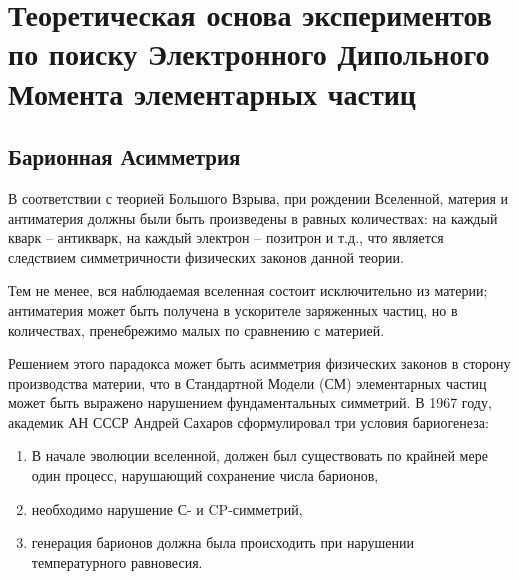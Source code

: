 \documentclass{report}
\begin{document}
\singlespacing


\tableofcontents 
\pagebreak

\onehalfspacing

\chapter{Теоретическая основа экспериментов по поиску Электронного Дипольного Момента элементарных частиц}
\newcommand{\dotprod}[2]{\; {#1} \cdot {#2}\;}
\newcommand{\xprod}[2]{{#1} \times {#2}}
\newcommand{\tensprod}[2]{#1 \otimes #2}
\newcommand{\SMatrix}{\mathcal{S}}
\newcommand{\TMatrix}{\mathcal{T}}
\newcommand{\IMatrix}{\mathcal{I}}

\newcommand{\ampl}[2]{\langle #1 \vert #2 \rangle}
\newcommand{\ket}[1]{\vert{#1}\rangle}
\newcommand{\bra}[1]{\langle{#1}\vert}

\section{Барионная Асимметрия} 

В соответствии с теорией Большого Взрыва, при рождении Вселенной, материя и антиматерия должны были быть произведены в равных количествах: на каждый кварк -- антикварк, на каждый электрон -- позитрон и т.д., что является следствием симметричности физических законов данной теории.

Тем не менее, вся наблюдаемая вселенная состоит исключительно из материи; антиматерия может быть получена в ускорителе заряженных частиц, но в количествах, пренебрежимо малых по сравнению с материей.

Решением этого парадокса может быть асимметрия физических законов в сторону производства материи, что в Стандартной Модели (СМ) элементарных частиц может быть выражено нарушением фундаментальных симметрий. В 1967 году, академик АН СССР Андрей Сахаров сформулировал три условия бариогенеза:~\cite{Perepelitsa:Baryogenesis}
\begin{enumerate}
\item В начале эволюции вселенной, должен был существовать по крайней мере один процесс, нарушающий сохранение числа барионов,
\item необходимо нарушение С- и CP-симметрий,
\item генерация барионов должна была происходить при нарушении температурного равновесия.
\end{enumerate}
\end{document}
